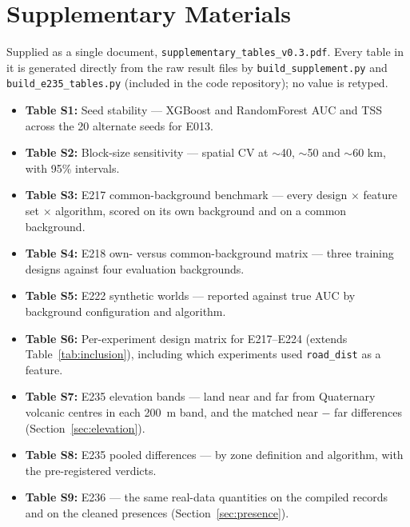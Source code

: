 \documentclass[12pt]{article}
\begin{document}
\section*{Supplementary Materials}

Supplied as a single document, \texttt{supplementary\_tables\_v0.3.pdf}. Every table in it is generated directly from the raw result files by \texttt{build\_supplement.py} and \texttt{build\_e235\_tables.py} (included in the code repository); no value is retyped.

\begin{itemize}
  \item \textbf{Table S1:} Seed stability --- XGBoost and RandomForest AUC and TSS across the 20 alternate seeds for E013.
  \item \textbf{Table S2:} Block-size sensitivity --- spatial CV at $\sim$40, $\sim$50 and $\sim$60 km, with 95\% intervals.
  \item \textbf{Table S3:} E217 common-background benchmark --- every design $\times$ feature set $\times$ algorithm, scored on its own background and on a common background.
  \item \textbf{Table S4:} E218 own- versus common-background matrix --- three training designs against four evaluation backgrounds.
  \item \textbf{Table S5:} E222 synthetic worlds --- reported against true AUC by background configuration and algorithm.
  \item \textbf{Table S6:} Per-experiment design matrix for E217--E224 (extends Table~\ref{tab:inclusion}), including which experiments used \texttt{road\_dist} as a feature.
  \item \textbf{Table S7:} E235 elevation bands --- land near and far from Quaternary volcanic centres in each 200~m band, and the matched near $-$ far differences (Section~\ref{sec:elevation}).
  \item \textbf{Table S8:} E235 pooled differences --- by zone definition and algorithm, with the pre-registered verdicts.
  \item \textbf{Table S9:} E236 --- the same real-data quantities on the compiled records and on the cleaned presences (Section~\ref{sec:presence}).
\end{itemize}
\end{document}
